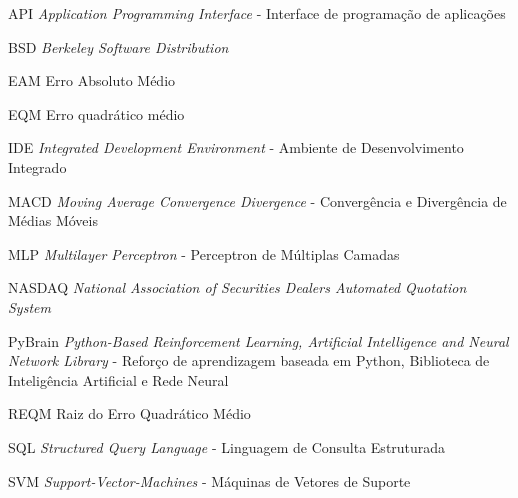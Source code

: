 \begin{siglas}
	\item[API] \textit{Application Programming Interface} - Interface de programação de aplicações
	\item[BSD] \textit{Berkeley Software Distribution}
	\item[EAM] Erro Absoluto Médio
	\item[EQM] Erro quadrático médio
	\item[IDE] \textit{Integrated Development Environment} - Ambiente de Desenvolvimento Integrado
	\item[MACD] \textit{Moving Average Convergence Divergence} - Convergência e Divergência de Médias Móveis
	\item[MLP] \textit{Multilayer Perceptron} - Perceptron de Múltiplas Camadas
	\item[NASDAQ] \textit{National Association of Securities Dealers Automated Quotation System}
	\item[PyBrain] \textit{Python-Based Reinforcement Learning, Artificial Intelligence and Neural Network Library} - Reforço de aprendizagem baseada em Python, Biblioteca de Inteligência Artificial e Rede Neural
	\item[REQM] Raiz do Erro Quadrático Médio
	\item[SQL] \textit{Structured Query Language} - Linguagem de Consulta Estruturada
	\item[SVM] \textit{Support-Vector-Machines } - Máquinas de Vetores de Suporte 
\end{siglas}

